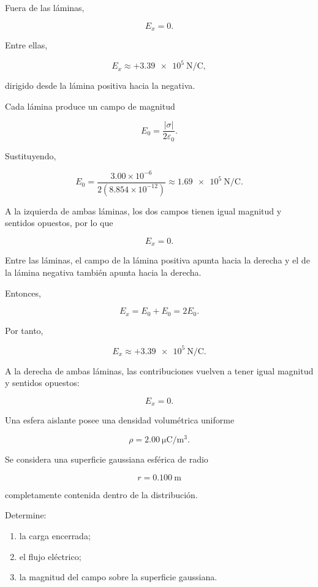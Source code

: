 \begin{respuesta}

Fuera de las láminas,

\[
\boxed{E_x=0}.
\]

Entre ellas,

\[
\boxed{E_x\approx+\SI{3.39e5}{\newton\per\coulomb}},
\]

dirigido desde la lámina positiva hacia la negativa.

\end{respuesta}

\begin{explicacion}

Cada lámina produce un campo de magnitud

\[
E_0=\frac{|\sigma|}{2\varepsilon_0}.
\]

Sustituyendo,

\[
E_0=
\frac{3.00\times10^{-6}}
{2(8.854\times10^{-12})}
\approx\SI{1.69e5}{\newton\per\coulomb}.
\]

A la izquierda de ambas láminas, los dos campos tienen igual magnitud y sentidos
opuestos, por lo que

\[
\boxed{E_x=0}.
\]

Entre las láminas, el campo de la lámina positiva apunta hacia la derecha y el de
la lámina negativa también apunta hacia la derecha.

Entonces,

\[
E_x=E_0+E_0=2E_0.
\]

Por tanto,

\[
\boxed{E_x\approx+\SI{3.39e5}{\newton\per\coulomb}}.
\]

A la derecha de ambas láminas, las contribuciones vuelven a tener igual magnitud y
sentidos opuestos:

\[
\boxed{E_x=0}.
\]

\end{explicacion}


\begin{ejercicio}

Una esfera aislante posee una densidad volumétrica uniforme

\[
\rho=\SI{2.00}{\micro\coulomb\per\metre\cubed}.
\]

Se considera una superficie gaussiana esférica de radio

\[
r=\SI{0.100}{\metre}
\]

completamente contenida dentro de la distribución.

Determine:

\begin{enumerate}
    \item la carga encerrada;
    \item el flujo eléctrico;
    \item la magnitud del campo sobre la superficie gaussiana.
\end{enumerate}

\end{ejercicio}

